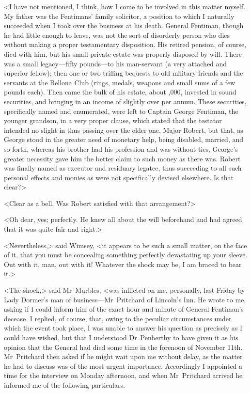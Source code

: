 <I have not mentioned, I think, how I come to be involved in this matter myself. My father was the Fentimans' family solicitor, a position to which I naturally succeeded when I took over the business at his death. General Fentiman, though he had little enough to leave, was not the sort of disorderly person who dies without making a proper testamentary disposition. His retired pension, of course, died with him, but his small private estate was properly disposed by will. There was a small legacy—fifty pounds—to his man-servant (a very attached and superior fellow); then one or two trifling bequests to old military friends and the servants at the Bellona Club (rings, medals, weapons and small sums of a few pounds each). Then came the bulk of his estate, about ,000, invested in sound securities, and bringing in an income of slightly over  per annum. These securities, specifically named and enumerated, were left to Captain George Fentiman, the younger grandson, in a very proper clause, which stated that the testator intended no slight in thus passing over the elder one, Major Robert, but that, as George stood in the greater need of monetary help, being disabled, married, and so forth, whereas his brother had his profession and was without ties, George's greater necessity gave him the better claim to such money as there was. Robert was finally named as executor and residuary legatee, thus succeeding to all such personal effects and monies as were not specifically devised elsewhere. Is that clear?>

<Clear as a bell. Was Robert satisfied with that arrangement?>

<Oh dear, yes; perfectly. He knew all about the will beforehand and had agreed that it was quite fair and right.>

<Nevertheless,> said Wimsey, <it appears to be such a small matter, on the face of it, that you must be concealing something perfectly devastating up your sleeve. Out with it, man, out with it! Whatever the shock may be, I am braced to bear it.>

<The shock,> said Mr~Murbles, <was inflicted on me, personally, last Friday by Lady Dormer's man of business—Mr~Pritchard of Lincoln's Inn. He wrote to me, asking if I could inform him of the exact hour and minute of General Fentiman's decease. I replied, of course, that, owing to the peculiar circumstances under which the event took place, I was unable to answer his question as precisely as I could have wished, but that I understood Dr~Penberthy to have given it as his opinion that the General had died some time in the forenoon of November 11th. Mr~Pritchard then asked if he might wait upon me without delay, as the matter he had to discuss was of the most urgent importance. Accordingly I appointed a time for the interview on Monday afternoon, and when Mr~Pritchard arrived he informed me of the following particulars.

